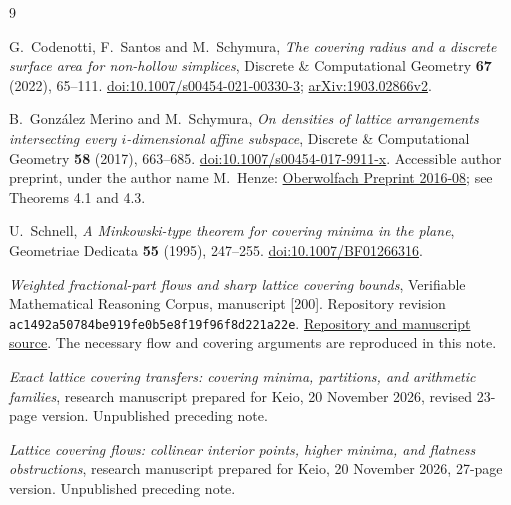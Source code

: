 \documentclass[11pt,a4paper]{article}
\theoremstyle{remark}\newtheorem{remark}[theorem]{Remark}
\begin{document}
\begin{thebibliography}{9}
\raggedright
{}
G.~Codenotti, F.~Santos and M.~Schymura,
\emph{The covering radius and a discrete surface area for non-hollow
simplices}, Discrete \& Computational Geometry \textbf{67} (2022),
65--111.
\href{https://doi.org/10.1007/s00454-021-00330-3}{doi:10.1007/s00454-021-00330-3};
\href{https://arxiv.org/abs/1903.02866v2}{arXiv:1903.02866v2}.

B.~Gonz\'alez Merino and M.~Schymura,
\emph{On densities of lattice arrangements intersecting every
$i$-dimensional affine subspace}, Discrete \& Computational Geometry
\textbf{58} (2017), 663--685.
\href{https://doi.org/10.1007/s00454-017-9911-x}{doi:10.1007/s00454-017-9911-x}.
Accessible author preprint, under the author name M.~Henze:
\href{https://publications.mfo.de/bitstream/handle/mfo/1118/OWP2016_08.pdf?isAllowed=y\&sequence=1}
{Oberwolfach Preprint 2016-08}; see Theorems 4.1 and 4.3.

U.~Schnell, \emph{A Minkowski-type theorem for covering minima in
the plane}, Geometriae Dedicata \textbf{55} (1995), 247--255.
\href{https://doi.org/10.1007/BF01266316}{doi:10.1007/BF01266316}.

\emph{Weighted fractional-part flows and sharp lattice covering bounds},
Verifiable Mathematical Reasoning Corpus, manuscript [200].
Repository revision
\texttt{ac1492a50784be919fe0b5e8f19f96f8d221a22e}.
\href{https://github.com/QEEDDD/Verifiable-Mathematical-Reasoning-Corpus}
{Repository and manuscript source}. The necessary flow and covering
arguments are reproduced in this note.

\emph{Exact lattice covering transfers: covering minima, partitions,
and arithmetic families}, research manuscript prepared for Keio,
20 November 2026, revised 23-page version. Unpublished preceding note.

\emph{Lattice covering flows: collinear interior points, higher minima,
and flatness obstructions}, research manuscript prepared for Keio,
20 November 2026, 27-page version. Unpublished preceding note.
\end{thebibliography}
\end{document}
